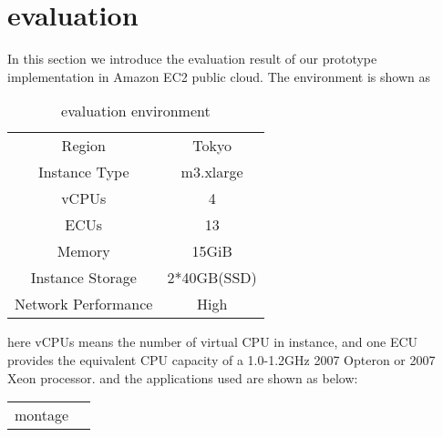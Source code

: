 \section{evaluation}
\label{sec:evaluation}
In this section we introduce the evaluation result of our prototype implementation in Amazon EC2 public cloud.
The environment is shown as 
\begin{table}[h]
\centering
\begin{tabular}{|c|c|}
Region				&		Tokyo		\\
Instance Type		&		m3.xlarge	\\
vCPUs				&		4			\\
ECUs				&		13			\\
Memory				&		15GiB		\\
Instance Storage	&		2*40GB(SSD)	\\
Network Performance	&		High		\\
\end{tabular}
\caption{evaluation environment}
\label{evaluation:environment}
\end{table}

here vCPUs means the number of virtual CPU in instance, and one ECU provides the equivalent CPU capacity of a 1.0-1.2GHz 2007 Opteron or 2007 Xeon processor.
and the applications used are shown as below:
\begin{table}
\centering
\begin{tabular}{|c|c|}
montage
\end{tabular}
\end{table}